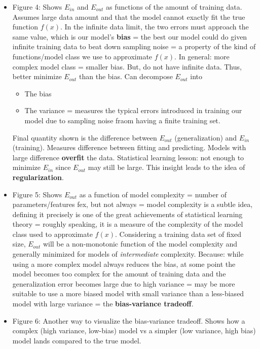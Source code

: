 \documentclass[norsk,a4paper,11pt]{article}
\begin{document}
\begin{itemize}
\begin{itemize}
			\item Figure 4: Shows $E_{in}$ and $E_{out}$ as functions of the amount of training data. Assumes large data amount and that the model cannot exactly fit the true function $f(x)$. In the infinite data limit, the two errors must approach the same value, which is our model's \textbf{bias} = the best our model could do given infinite training data to beat down sampling noise = a property of the kind of functions/model class we use to approximate $f(x)$. In general: more complex model class = smaller bias. But, do not have infinite data. Thus, better minimize $E_{out}$ than the bias. Can decompose $E_{out}$ into
			\begin{itemize}
				\item The bias
				\item The variance = measures the typical errors introduced in training our model due to sampling noise fraom having a finite training set.
			\end{itemize}
			Final quantity shown is the difference between $E_{out}$ (generalization) and $E_{in}$ (training). Measures difference between fitting and predicting. Models with large difference \textbf{overfit} the data. Statistical learning lesson: not enough to minimize $E_{in}$ since $E_{out}$ may still be large. This insight leads to the idea of \textbf{regularization}.
			\item Figure 5: Shows $E_{out}$ as a function of model complexity = number of parameters/features fex, but not always = model complexity is a subtle idea, defining it precisely is one of the great achievements of statistical learning theory = roughly speaking, it is a measure of the complexity of the model class used to approximate $f(x)$. Considering a training data set of fixed size, $E_{out}$ will be a non-monotonic function of the model complexity and generally minimized for models of \textit{intermediate} complexity. Because: while using a more complex model always reduces the bias, at some point the model becomes too complex for the amount of training data and the generalization error becomes large due to high variance = may be more suitable to use a more biased model with small variance than a less-biased model with large variance = the \textbf{bias-variance tradeoff}.
			\item Figure 6: Another way to visualize the bias-variance tradeoff. Shows how a complex (high variance, low-bias) model vs a simpler (low variance, high bias) model lands compared to the true model.
			\begin{itemize}

\end{itemize}
\end{itemize}
\end{itemize}
\end{document}
